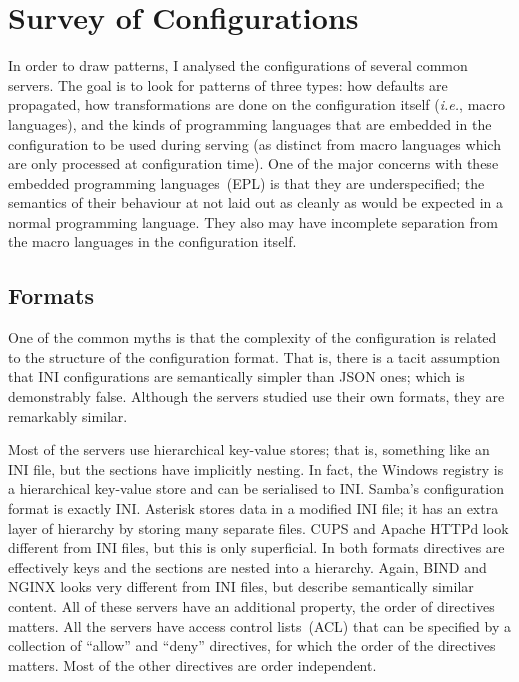 \documentclass[letterpaper,twocolumn,10pt]{article}
\begin{document}
\section{Survey of Configurations}
In order to draw patterns, I analysed the configurations of several common servers. The goal is to look for patterns of three types: how defaults are propagated, how transformations are done on the configuration itself (\emph{i.e.}, macro languages), and the kinds of programming languages that are embedded in the configuration to be used during serving (as distinct from macro languages which are only processed at configuration time). One of the major concerns with these embedded programming languages~(EPL) is that they are underspecified; the semantics of their behaviour at not laid out as cleanly as would be expected in a normal programming language. They also may have incomplete separation from the macro languages in the configuration itself.

\subsection{Formats}
One of the common myths is that the complexity of the configuration is related to the structure of the configuration format. That is, there is a tacit assumption that INI configurations are semantically simpler than JSON ones; which is demonstrably false. Although the servers studied use their own formats, they are remarkably similar.

Most of the servers use hierarchical key-value stores; that is, something like an INI file, but the sections have implicitly nesting. In fact, the Windows registry is a hierarchical key-value store and can be serialised to INI. Samba's configuration format is exactly INI.\cite{samba} Asterisk stores data in a modified INI file; it has an extra layer of hierarchy by storing many separate files.\cite{asterisk} CUPS and Apache HTTPd look different from INI files, but this is only superficial. In both formats directives are effectively keys and the sections are nested into a hierarchy.\cite{cups,apache} Again, BIND and NGINX looks very different from INI files, but describe semantically similar content.\cite{bind,nginx} All of these servers have an additional property, the order of directives matters. All the servers have access control lists~(ACL) that can be specified by a collection of ``allow'' and ``deny'' directives, for which the order of the directives matters. Most of the other directives are order independent.
\end{document}
